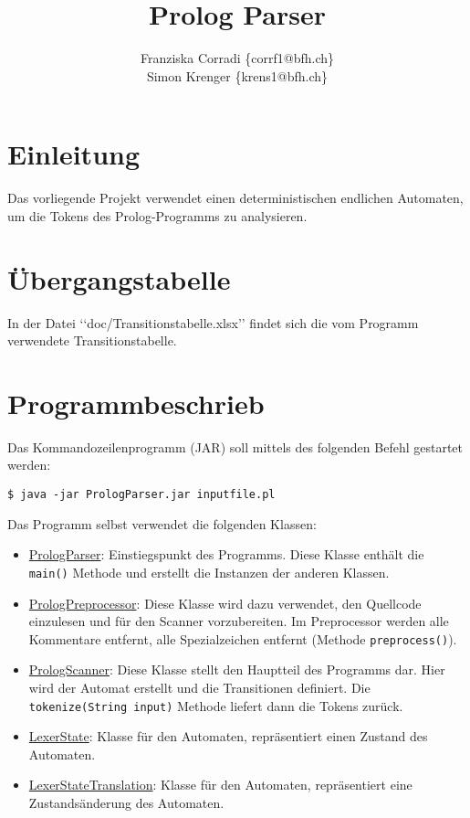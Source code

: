 \documentclass{article}
\title{Prolog Parser}
\author{Franziska Corradi \{corrf1@bfh.ch\}\\Simon Krenger \{krens1@bfh.ch\}}
\begin{document}
\maketitle
\section{Einleitung}
Das vorliegende Projekt verwendet einen deterministischen endlichen Automaten, um die Tokens des Prolog-Programms zu analysieren.

\section{Übergangstabelle}
In der Datei \lq\lq{}doc/Transitionstabelle.xlsx\rq\rq{} findet sich die vom Programm verwendete Transitionstabelle.

\section{Programmbeschrieb}
Das Kommandozeilenprogramm (JAR) soll mittels des folgenden Befehl gestartet werden:
\begin{lstlisting}
$ java -jar PrologParser.jar inputfile.pl
\end{lstlisting}
Das Programm selbst verwendet die folgenden Klassen:
\begin{itemize}
\item \underline{PrologParser}: Einstiegspunkt des Programms. Diese Klasse enthält die \texttt{main()} Methode und erstellt die Instanzen der anderen Klassen.
\item \underline{PrologPreprocessor}: Diese Klasse wird dazu verwendet, den Quellcode einzulesen und für den Scanner vorzubereiten. Im Preprocessor werden alle Kommentare entfernt, alle Spezialzeichen entfernt (Methode \texttt{preprocess()}).
\item \underline{PrologScanner}: Diese Klasse stellt den Hauptteil des Programms dar. Hier wird der Automat erstellt und die Transitionen definiert. Die \texttt{tokenize(String input)} Methode liefert dann die Tokens zurück.
\item \underline{LexerState}: Klasse für den Automaten, repräsentiert einen Zustand des Automaten.
\item \underline{LexerStateTranslation}: Klasse für den Automaten, repräsentiert eine Zustandsänderung des Automaten.

\end{itemize}

\newpage
\end{document}
